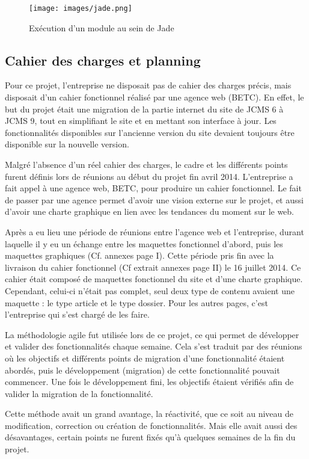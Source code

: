 \documentclass[12pt,a4paper]{article}
\begin{document}
\begin{figure}[h!]
\centering
\texttt{[image: images/jade.png]} 
\caption{Exécution d'un module au sein de Jade}
\end{figure}

\newpage
\subsection{Cahier des charges et planning}
Pour ce projet, l'entreprise ne disposait pas de cahier des charges précis, mais disposait d'un cahier fonctionnel réalisé par une agence web (BETC). En effet, le but du projet était une migration de la partie internet du site de \gls{JCMS} 6 à \gls{JCMS} 9, tout en simplifiant le site et en mettant son interface à jour. Les fonctionnalités disponibles sur l'ancienne version du site devaient toujours être disponible sur la nouvelle version.\par
\medskip
Malgré l’absence d’un réel cahier des charges, le cadre et les différents points furent définis lors de réunions au début du projet fin avril 2014. L'entreprise a fait appel à une agence web, BETC, pour produire un cahier fonctionnel. Le fait de passer par une agence permet d'avoir une vision externe sur le projet, et aussi d'avoir une charte graphique en lien avec les tendances du moment sur le web.\par 
Après a eu lieu une période de réunions entre l'agence web et l'entreprise, durant laquelle il y eu un échange entre les maquettes fonctionnel d'abord, puis les maquettes graphiques (Cf. annexes page I). Cette période pris fin avec la livraison du cahier fonctionnel (Cf extrait annexes page II) le 16 juillet 2014. Ce cahier était composé de maquettes fonctionnel du site et d'une charte graphique. Cependant, celui-ci n'était pas complet, seul deux type de contenu avaient une maquette : le type article et le type dossier. Pour les autres pages, c'est l'entreprise qui s'est chargé de les faire.\par
\medskip
La méthodologie agile fut utilisée lors de ce projet, ce qui permet de développer et valider des fonctionnalités chaque semaine. Cela s'est traduit par des réunions où les objectifs et différents points de migration d'une fonctionnalité étaient abordés, puis le développement (migration) de cette fonctionnalité pouvait commencer. Une fois le développement fini, les objectifs étaient vérifiés afin de valider la migration de la fonctionnalité.\par 
Cette méthode avait un grand avantage, la réactivité, que ce soit au niveau de modification, correction ou création de fonctionnalités. Mais elle avait aussi des désavantages, certain points ne furent fixés qu'à quelques semaines de la fin du projet.\par 
\end{document}
